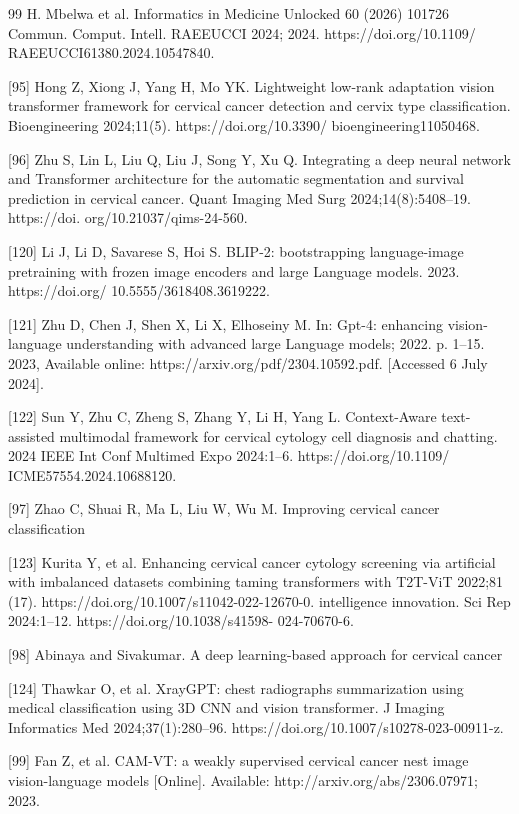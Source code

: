 \documentclass[final,5p,times,twocolumn,authoryear]{elsarticle}
\begin{document}
\begin{thebibliography}{99}
 H. Mbelwa et al. Informatics in Medicine Unlocked 60 (2026) 101726 Commun. Comput. Intell. RAEEUCCI 2024; 2024. https://doi.org/10.1109/ RAEEUCCI61380.2024.10547840.

 [95] Hong Z, Xiong J, Yang H, Mo YK. Lightweight low-rank adaptation vision transformer framework for cervical cancer detection and cervix type classification. Bioengineering 2024;11(5). https://doi.org/10.3390/ bioengineering11050468.

 [96] Zhu S, Lin L, Liu Q, Liu J, Song Y, Xu Q. Integrating a deep neural network and Transformer architecture for the automatic segmentation and survival prediction in cervical cancer. Quant Imaging Med Surg 2024;14(8):5408–19. https://doi. org/10.21037/qims-24-560.

 [120] Li J, Li D, Savarese S, Hoi S. BLIP-2: bootstrapping language-image pretraining with frozen image encoders and large Language models. 2023. https://doi.org/ 10.5555/3618408.3619222.

 [121] Zhu D, Chen J, Shen X, Li X, Elhoseiny M. In: Gpt-4: enhancing vision-language understanding with advanced large Language models; 2022. p. 1–15. 2023, Available online: https://arxiv.org/pdf/2304.10592.pdf. [Accessed 6 July 2024].

 [122] Sun Y, Zhu C, Zheng S, Zhang Y, Li H, Yang L. Context-Aware text-assisted multimodal framework for cervical cytology cell diagnosis and chatting. 2024 IEEE Int Conf Multimed Expo 2024:1–6. https://doi.org/10.1109/ ICME57554.2024.10688120.

 [97] Zhao C, Shuai R, Ma L, Liu W, Wu M. Improving cervical cancer classification

 [123] Kurita Y, et al. Enhancing cervical cancer cytology screening via artificial with imbalanced datasets combining taming transformers with T2T-ViT 2022;81 (17). https://doi.org/10.1007/s11042-022-12670-0. intelligence innovation. Sci Rep 2024:1–12. https://doi.org/10.1038/s41598- 024-70670-6.

 [98] Abinaya and Sivakumar. A deep learning-based approach for cervical cancer

 [124] Thawkar O, et al. XrayGPT: chest radiographs summarization using medical classification using 3D CNN and vision transformer. J Imaging Informatics Med 2024;37(1):280–96. https://doi.org/10.1007/s10278-023-00911-z.

 [99] Fan Z, et al. CAM-VT: a weakly supervised cervical cancer nest image vision-language models [Online]. Available: http://arxiv.org/abs/2306.07971; 2023.


\end{thebibliography}
\end{document}
